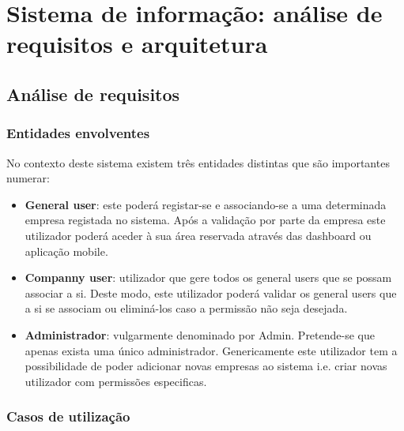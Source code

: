 

\chapter{Sistema de informação: análise de requisitos e arquitetura}






\section{Análise de requisitos}


\subsection{Entidades envolventes}


No contexto deste sistema existem três entidades distintas que são importantes numerar: 

\begin{itemize}
	
	\item \textbf{General user}: este poderá registar-se e associando-se a uma determinada empresa registada no sistema. Após a validação por parte da empresa este utilizador poderá aceder à sua área reservada através das dashboard ou aplicação mobile. 
	
	\item \textbf{Companny user}: utilizador que gere todos os general users que se possam associar a si. Deste modo, este utilizador poderá validar os general users que a si se associam ou eliminá-los caso a permissão não seja desejada.  
	
	\item \textbf{Administrador}: vulgarmente denominado por Admin. Pretende-se que apenas exista uma único administrador. Genericamente este utilizador tem a possibilidade de poder adicionar novas empresas ao sistema i.e. criar novas utilizador com permissões especificas. 
	
\end{itemize}



\newpage

\subsection{Casos de utilização}


